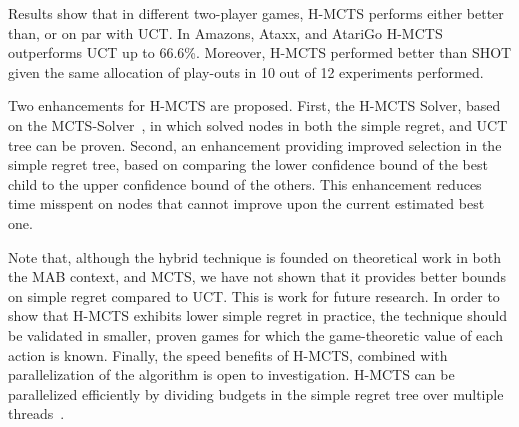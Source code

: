 \documentclass{kecsmstr}
\begin{document}
Results show that in different two-player games, H-MCTS performs either better than, or on par with UCT. In Amazons, Ataxx, and AtariGo H-MCTS outperforms UCT up to 66.6\%. Moreover, H-MCTS performed better than SHOT given the same allocation of play-outs in 10 out of 12 experiments performed.

Two enhancements for H-MCTS are proposed. First, the H-MCTS Solver, based on the MCTS-Solver~, in which solved nodes in both the simple regret, and UCT tree can be proven. Second, an enhancement providing improved selection in the simple regret tree, based on comparing the lower confidence bound of the best child to the upper confidence bound of the others. This enhancement reduces time misspent on nodes that cannot improve upon the current estimated best one.

Note that, although the hybrid technique is founded on theoretical work in both the MAB context, and MCTS, we have not shown that it provides better bounds on simple regret compared to UCT. This is work for future research. In order to show that H-MCTS exhibits lower simple regret in practice, the technique should be validated in smaller, proven games for which the game-theoretic value of each action is known. Finally, the speed benefits of H-MCTS, combined with parallelization of the algorithm is open to investigation. H-MCTS can be parallelized efficiently by dividing budgets in the simple regret tree over multiple threads~.

 \emptypage

\appendix



\end{document}
